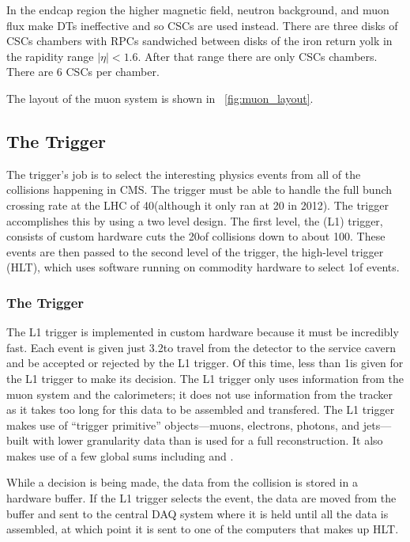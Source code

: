 In the endcap region the higher magnetic field, neutron background, and muon
flux make DTs ineffective and so CSCs are used instead. There are three disks
of CSCs chambers with RPCs sandwiched between disks of the iron return yolk in
the rapidity range $|\eta| < 1.6$. After that range there are only CSCs
chambers. There are 6 CSCs per chamber.

The layout of the muon system is shown in \FIG~\ref{fig:muon_layout}.

\subsection{The Trigger}

The trigger's job is to select the interesting physics events from all of the
collisions happening in CMS. The trigger must be able to handle the full bunch
crossing rate at the LHC of 40\megahertz (although it only ran at 20\megahertz
in 2012). The trigger accomplishes this by using a two level design. The first
level, the \Lone (L1) trigger, consists of custom hardware cuts the
20\megahertz of collisions down to about 100\kilohertz. These events are then
passed to the second level of the trigger, the high-level trigger (HLT), which
uses software running on commodity hardware to select 1\kilohertz of events.

\subsubsection{The \Lone Trigger}

The L1 trigger is implemented in custom hardware because it must be incredibly
fast. Each event is given just 3.2\microseconds to travel from the detector to
the service cavern and be accepted or rejected by the L1 trigger. Of this time,
less than 1\microseconds is given for the L1 trigger to make its decision. The
L1 trigger only uses information from the muon system and the calorimeters; it
does not use information from the tracker as it takes too long for this
data to be assembled and transfered. The L1 trigger makes use of ``trigger
primitive'' objects---muons, electrons, photons, and jets---built with lower
granularity data than is used for a full reconstruction. It also makes use of a
few global sums including \ET and \MET.

While a decision is being made, the data from the collision is stored in a
hardware buffer. If the L1 trigger selects the event, the data are moved from
the buffer and sent to the central DAQ system where it is held until all the
data is assembled, at which point it is sent to one of the computers that makes
up HLT.

